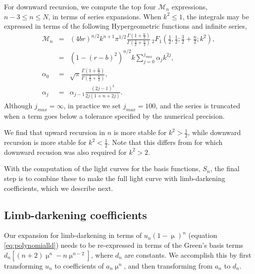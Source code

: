 \documentclass[modern]{aastex61}
\begin{document}
For downward recursion, we compute the top four $\mathcal{M}_n$ expressions, $n-3 \le n \le N$,
in terms of series expansions.
When $k^2 \le 1$, the integrals may be expressed in terms of the following
Hypergeometric functions and infinite series,
\begin{eqnarray}
\mathcal{M}_n &=& (4br)^{n/2} k^{n+1} \pi^{1/2} \frac{\Gamma{(1+\tfrac{n}{2})}}{\Gamma(\tfrac{3}{2}+\tfrac{n}{2})} \,_2F_1(\tfrac{1}{2},\tfrac{1}{2};\tfrac{3}{2}+\tfrac{n}{2};k^2),\\
&=& (1-(r-b)^2)^{n/2} k \sum_{j=0}^{j_{max}} \alpha_j k^{2j},\\
\alpha_0 &=& \sqrt{\pi} \frac{\Gamma(1+\tfrac{n}{2})}{\Gamma(\tfrac{3}{2}+\tfrac{n}{2})},\\
\alpha_j &=& \alpha_{j-1} \frac{(2j-1)^2}{2j(1+n+2j)}.
\end{eqnarray}
Although $j_{max} = \infty$, in practice we set $j_{max} = 100$, and the series is 
truncated when a term goes below a tolerance specified by the numerical precision.

We find that upward recursion in $n$ is more stable for $k^2 > \tfrac{1}{2} $,
while downward recursion is more stable for $k^2 < \tfrac{1}{2}$.  Note that
this differs from \starry for which downward recusion was also required for $k^2 > 2$.

With the computation of the light curves for the basis functions, $S_n$, the final step is to
combine these to make the full light curve with limb-darkening coefficients, which we describe
next.

\subsection{Limb-darkening coefficients}

Our expansion for limb-darkening in terms of $u_n(1-\upmu)^n$ (equation \ref{eq:polynomialld}) needs to
be re-expressed in terms of the Green's basis terms $d_n \left[(n+2)\upmu^n -n \upmu^{n-2}\right]$,
where $d_n$ are constants.
We accomplish this by first transforming $u_n$ to coefficients of $a_n \upmu^n$,
and then transforming from $a_n$ to $d_n$.
\end{document}
